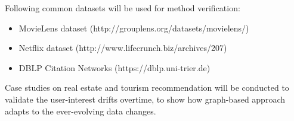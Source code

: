 Following common datasets will be used for method verification: 

\begin{itemize}

\item MovieLens dataset (http://grouplens.org/datasets/movielens/) 

\item Netflix dataset (http://www.lifecrunch.biz/archives/207) 

\item DBLP Citation Networks (https://dblp.uni-trier.de)  

\end{itemize}

Case studies on real estate and tourism recommendation will be conducted to validate the user-interest drifts overtime, to show how graph-based approach adapts to the ever-evolving data changes. 
